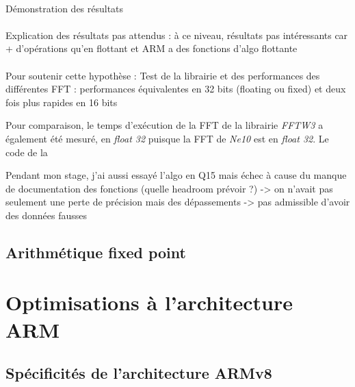 \documentclass{article}
\begin{document}
    \paragraph{}
    Démonstration des résultats

    \paragraph{}
    Explication des résultats pas attendus : à ce niveau, résultats pas intéressants car + d'opérations qu'en flottant et ARM a des fonctions d'algo flottante

    \paragraph{}
    Pour soutenir cette hypothèse :  Test de la librairie et des performances des différentes FFT : performances équivalentes en 32 bits (floating ou fixed) et deux fois plus rapides en 16 bits


    Pour comparaison, le temps d'exécution de la FFT de la librairie \emph{FFTW3} a également été mesuré, en \emph{float 32} puisque la FFT de \emph{Ne10} est en \emph{float 32}. Le code de la 

    Pendant mon stage, j'ai aussi essayé l'algo en Q15 mais échec à cause du manque de documentation des fonctions (quelle headroom prévoir ?) -> on n'avait pas seulement une perte de précision mais des dépassements -> pas admissible d'avoir des données fausses




    \subsection{Arithmétique fixed point}
 




    \section{Optimisations à l'architecture ARM}
    \subsection{Spécificités de l'architecture ARMv8}
\end{document}
